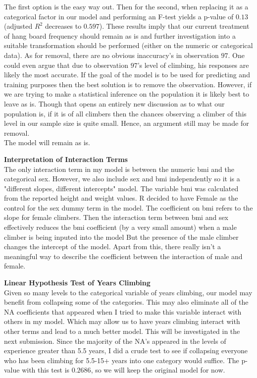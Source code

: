 \documentclass[11pt]{amsart}
\begin{document}
The first option is the easy way out. Then for the second, when replacing it as a categorical factor in our model and performing an F-test yields a p-value of $0.13$ (adjusted $R^2$ decreases to $0.597$). These results imply that our current treatment of hang board frequency should remain as is and further investigation into a suitable transformation should be performed (either on the numeric or categorical data).
As for removal, there are no obvious inaccuracy's in observation $97$. One could even argue that due to observation $97$'s level of climbing, his responses are likely the most accurate. 
If the goal of the model is to be used for predicting and training purposes then the best solution is to remove the observation.
However, if we are trying to make a statistical inference on the population it is likely best to leave as is.
Though that opens an entirely new discussion as to what our population is, if it is of all climbers then the chances observing a climber of this level in our sample size is quite small. 
Hence, an argument still may be made for removal. \\

The model will remain as is.

\newpage
{\bf Interpretation of Interaction Terms}\\
The only interaction term in my model is between the numeric bmi and the categorical sex.
However, we also include sex and bmi independently so it is a "different slopes, different intercepts" model.
The variable bmi was calculated from the reported height and weight values.
R decided to have Female as the control for the sex dummy term in the model.
The coefficient on bmi refers to the slope for female climbers.
Then the interaction term between bmi and sex effectively reduces the bmi coefficient (by a very small amount) when a male climber is being inputed into the model
But the presence of the male climber changes the intercept of the model.
Apart from this, there really isn't a meaningful way to describe the coefficient between the interaction of male and female.
\vspace{.3in}

{\bf Linear Hypothesis Test of Years Climbing}\\
Given so many levels to the categorical variable of years climbing, our model may benefit from collapsing some of the categories. This may also eliminate all of the NA coefficients that appeared when I tried to make this variable interact with others in my model.
Which may allow us to have years climbing interact with other terms and lead to a much better model.
This will be investigated in the next submission.
Since the majority of the NA's appeared in the levels of experience greater than 5.5 years, I did a crude test to see if collapsing everyone who has been climbing for 5.5-15+ years into one category would suffice. The p-value with this test is $0.2686$, so we will keep the original model for now.
\end{document}
